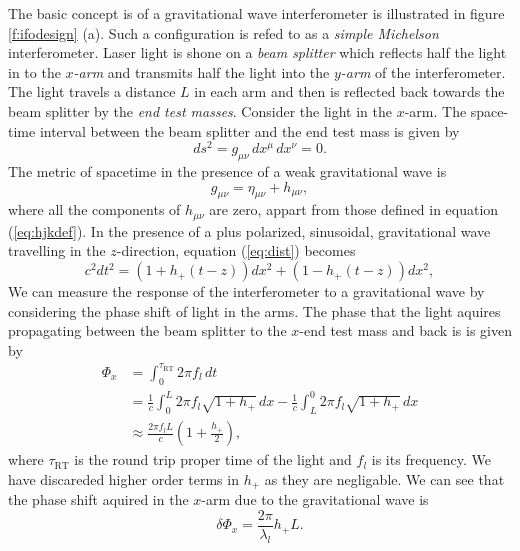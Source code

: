 The basic concept is of a gravitational wave interferometer is illustrated in
figure \ref{f:ifodesign} (a). Such a configuration is refed to as a
\emph{simple Michelson} interferometer. Laser light is shone on a \emph{beam
splitter} which reflects half the light in to the \emph{$x$-arm} and transmits
half the light into the \emph{$y$-arm} of the interferometer. The light
travels a distance $L$ in each arm and then is reflected back towards the beam
splitter by the \emph{end test masses}. Consider the light in the $x$-arm. The
space-time interval between the beam splitter and the end test mass is given
by
\begin{equation}
ds^2 = g_{\mu\nu}\, dx^\mu\, dx^\nu = 0.
\label{eq:dist}
\end{equation}
The metric of spacetime in the presence of a weak gravitational wave is
\begin{equation}
g_{\mu\nu} = \eta_{\mu\nu} + h_{\mu\nu},
\end{equation}
where all the components of $h_{\mu\nu}$ are zero, appart from those defined
in equation (\ref{eq:hjkdef}). In the presence of a plus polarized,
sinusoidal, gravitational wave travelling in the $z$-direction, equation
(\ref{eq:dist}) becomes
\begin{equation}
c^2 dt^2 = \left(1 + h_{+}(t-z)\right) dx^2 + \left(1 - h_{+}(t-z)\right) dx^2,
\end{equation}
We can measure the response of the interferometer to a gravitational wave by
considering the phase shift of light in the arms. The phase that the light
aquires propagating between the beam splitter to the $x$-end test mass and
back is is given by\cite{Saulson:1994}
\begin{equation}
\begin{split}
\Phi_x &= \int_0^{\tau_\mathrm{RT}} 2\pi f_l\, dt \\
&= \frac{1}{c} \int_0^L 2\pi f_l \sqrt{1 + h_{+}}\,dx -
\frac{1}{c} \int_L^0 2\pi f_l \sqrt{1 + h_{+}}\,dx \\
&\approx \frac{2\pi f_l L}{c} \left(1 + \frac{h_{+}}{2}\right),
\end{split}
\end{equation}
where $\tau_\mathrm{RT}$ is the round trip proper time of the light and $f_l$ is
its frequency. We have discareded  higher order terms in $h_+$ as they are
negligable.  We can see that the phase shift aquired in the $x$-arm due to the
gravitational wave is
\begin{equation}
\delta \Phi_x = \frac{2\pi}{\lambda_l} h_{+} L.
\end{equation}
